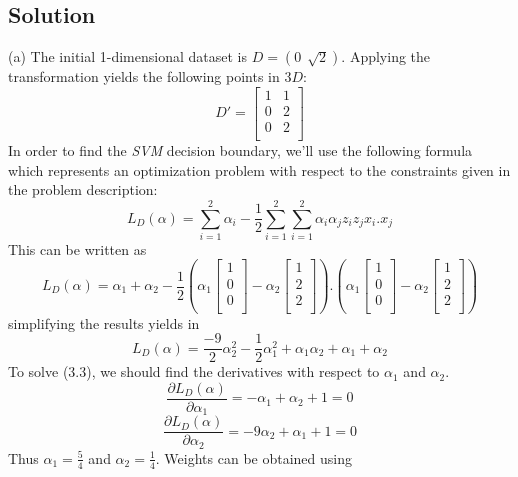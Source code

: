 \documentclass[12pt]{article}
\numberwithin{equation}{section}
\numberwithin{table}{section}
\numberwithin{figure}{section}
\newcommand{\der}[2]{\frac{\partial {#1}}{\partial {#2}}}
\begin{document}
\subsection*{Solution}
(a) The initial 1-dimensional dataset is $D = (0 \ \ \sqrt{2})$. Applying the transformation yields the following points in $3D$:
$$
	D' = \begin{bmatrix}
	1 & 1 \\
	0 & 2 \\
	0 & 2 \\
	\end{bmatrix}
$$
In order to find the \textit{SVM} decision boundary, we'll use the following formula which represents an optimization problem with respect to the constraints given in the problem description:
\begin{equation}
	L_D(\alpha) = \sum_{i = 1}^{2}\alpha_i - \frac{1}{2}\sum_{i = 1}^{2}\sum_{i = 1}^{2}\alpha_i\alpha_jz_iz_jx_i.x_j
\end{equation}
This can be written as
$$
	L_D(\alpha) = \alpha_1 + \alpha_2 - \frac{1}{2}(\alpha_1\begin{bmatrix}
	1 \\ 
	0 \\
	0 \\
	\end{bmatrix} - \alpha_2\begin{bmatrix}
	1 \\ 
	2 \\
	2 \\
	\end{bmatrix}).(\alpha_1\begin{bmatrix}
	1 \\ 
	0 \\
	0 \\
	\end{bmatrix} - \alpha_2\begin{bmatrix}
	1 \\ 
	2 \\
	2 \\
	\end{bmatrix})
$$
simplifying the results yields in 
\begin{equation}
		L_D(\alpha) = \frac{-9}{2}\alpha_2^2 - \frac{1}{2}\alpha_1^2 + \alpha_1\alpha_2 + \alpha_1 + \alpha_2
\end{equation}
To solve (3.3), we should find the derivatives with respect to $\alpha_1$ and $\alpha_2$.
$$
	\der{L_D(\alpha)}{\alpha_1} = -\alpha_1 + \alpha_2 + 1 = 0
$$
$$
	\der{L_D(\alpha)}{\alpha_2} = -9\alpha_2 + \alpha_1 + 1 = 0
$$
Thus $\alpha_1 = \frac{5}{4}$ and $\alpha_2 = \frac{1}{4}$. Weights can be obtained using
\end{document}
